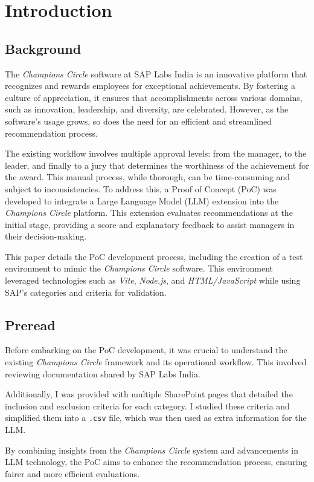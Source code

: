 \chapter{Introduction}
\label{introduction}
\nocite{*}

\section{Background}
The \textit{Champions Circle} software at SAP Labs India is an innovative platform that recognizes and rewards employees for exceptional achievements. 
By fostering a culture of appreciation, it ensures that accomplishments across various domains, such as innovation, leadership, and diversity, are celebrated. 
However, as the software's usage grows, so does the need for an efficient and streamlined recommendation process.

The existing workflow involves multiple approval levels: from the manager, to the leader, and finally to a jury that determines the worthiness of the achievement for the award. 
This manual process, while thorough, can be time-consuming and subject to inconsistencies. 
To address this, a Proof of Concept (\ac{PoC}) was developed to integrate a Large Language Model (\ac{LLM}) extension into the \textit{Champions Circle} platform. 
This extension evaluates recommendations at the initial stage, providing a score and explanatory feedback to assist managers in their decision-making.

This paper details the \ac{PoC} development process, including the creation of a test environment to mimic the \textit{Champions Circle} software. 
This environment leveraged technologies such as \textit{Vite}, \textit{Node.js}, and \textit{HTML/JavaScript} while using SAP's categories and criteria for validation.

\section{Preread}
Before embarking on the \ac{PoC} development, it was crucial to understand the existing \textit{Champions Circle} framework and its operational workflow. 
This involved reviewing documentation shared by SAP Labs India. 

Additionally, I was provided with multiple SharePoint pages that detailed the inclusion and exclusion criteria for each category. 
I studied these criteria and simplified them into a \texttt{.csv} file, which was then used as extra information for the \ac{LLM}.

By combining insights from the \textit{Champions Circle} system and advancements in \ac{LLM} technology, the \ac{PoC} aims to enhance the recommendation process, 
ensuring fairer and more efficient evaluations.